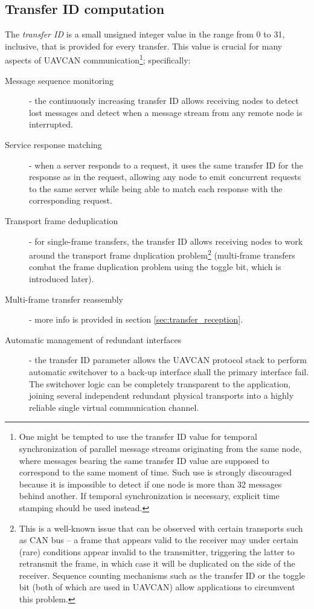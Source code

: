 \subsection{Transfer ID computation}\label{sec:transfer_id}

The \emph{transfer ID} is a small unsigned integer value in the range from 0 to 31, inclusive,
that is provided for every transfer.
This value is crucial for many aspects of UAVCAN communication\footnote{One might be tempted to use the transfer ID
value for temporal synchronization of parallel message streams originating from the same node,
where messages bearing the same transfer ID value are supposed to correspond to the same moment of time.
Such use is strongly discouraged because it is impossible to detect if one node is more than
32 messages behind another.
If temporal synchronization is necessary, explicit time stamping should be used instead.};
specifically:
\begin{description}
    \item[Message sequence monitoring] - the continuously increasing transfer ID allows receiving nodes to
    detect lost messages and detect when a message stream from any remote node is interrupted.

    \item[Service response matching] - when a server responds to a request, it uses the same transfer ID for the
    response as in the request,
    allowing any node to emit concurrent requests to the same server while being able to
    match each response with the corresponding request.

    \item[Transport frame deduplication] - for single-frame transfers,
    the transfer ID allows receiving nodes to work around the transport
    frame duplication problem\footnote{This is a well-known issue that can be observed with certain
    transports such as CAN bus -- a frame that appears valid to the receiver may under certain
    (rare) conditions appear invalid to the transmitter, triggering the latter to retransmit the frame,
    in which case it will be duplicated on the side of the receiver.
    Sequence counting mechanisms such as the transfer ID or the toggle bit (both of which are used in UAVCAN)
    allow applications to circumvent this problem.} (multi-frame transfers combat the frame duplication
    problem using the toggle bit, which is introduced later).

    \item[Multi-frame transfer reassembly] - more info is provided in section \ref{sec:transfer_reception}.

    \item[Automatic management of redundant interfaces] - the transfer ID parameter allows the UAVCAN protocol
    stack to perform automatic switchover to a back-up interface shall the primary interface fail.
    The switchover logic can be completely transparent to the application, joining several independent
    redundant physical transports into a highly reliable single virtual communication channel.
\end{description}

